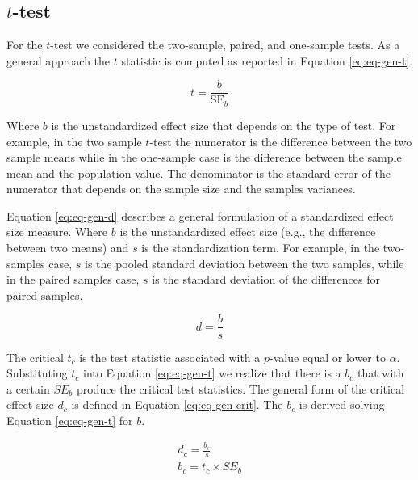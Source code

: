 \documentclass[
  man,floatsintext]{apa7}
\begin{document}
\subsection{\texorpdfstring{\(t\)-test}{t-test}}\label{t-test}

For the \(t\)-test we considered the two-sample, paired, and one-sample tests. As a general approach the \(t\) statistic is computed as reported in Equation \eqref{eq:eq-gen-t}.

\begin{equation}
    \label{eq:eq-gen-t}
    t = \frac{b}{\text{SE}_{b}}
\end{equation}

Where \(b\) is the unstandardized effect size that depends on the type of test. For example, in the two sample \(t\)-test the numerator is the difference between the two sample means while in the one-sample case is the difference between the sample mean and the population value. The denominator is the standard error of the numerator that depends on the sample size and the samples variances.

Equation \eqref{eq:eq-gen-d} describes a general formulation of a standardized effect size measure. Where \(b\) is the unstandardized effect size (e.g., the difference between two means) and \(s\) is the standardization term. For example, in the two-samples case, \(s\) is the pooled standard deviation between the two samples, while in the paired samples case, \(s\) is the standard deviation of the differences for paired samples.

\begin{equation}
    \label{eq:eq-gen-d}
    d = \frac{b}{s}
\end{equation}

The critical \(t_c\) is the test statistic associated with a \(p\)-value equal or lower to \(\alpha\). Substituting \(t_c\) into Equation \eqref{eq:eq-gen-t} we realize that there is a \(b_c\) that with a certain \(SE_b\) produce the critical test statistics. The general form of the critical effect size \(d_c\) is defined in Equation \eqref{eq:eq-gen-crit}. The \(b_c\) is derived solving Equation \eqref{eq:eq-gen-t} for \(b\).

\begin{equation}
\begin{gathered}
    \label{eq:eq-gen-crit}
    d_c = \frac{b_c}{s} \\
    b_c = t_c \times SE_b
\end{gathered}
\end{equation}
\end{document}
